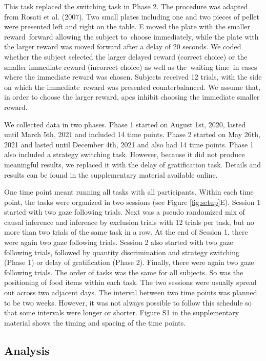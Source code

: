 \documentclass[
  man,floatsintext]{apa6}
\begin{document}
This task replaced the switching task in Phase 2. The procedure was adapted from Rosati et al. (2007). Two small plates including one and two pieces of pellet were presented left and right on the table. E moved the plate with the smaller reward~forward allowing the subject to~choose immediately, while the plate with the larger reward was moved forward after a delay of 20 seconds. We coded whether the subject selected the larger delayed reward (correct choice) or the smaller immediate reward (incorrect choice) as well as the~waiting time~in cases where the immediate reward was chosen. Subjects received 12 trials, with the side on which the immediate~reward was presented counterbalanced. We assume that, in order to choose the larger reward, apes inhibit choosing the immediate smaller reward.

We collected data in two phases. Phase 1 started on August 1st, 2020, lasted until March 5th, 2021 and included 14 time points. Phase 2 started on May 26th, 2021 and lasted until December 4th, 2021 and also had 14 time points. Phase 1 also included a strategy switching task. However, because it did not produce meaningful results, we replaced it with the delay of gratification task. Details and results can be found in the supplementary material available online.

One time point meant running all tasks with all participants. Within each time point, the tasks were organized in two sessions (see Figure \ref{fig:setup}E). Session 1 started with two gaze following trials. Next was a pseudo randomized mix of causal inference and inference by exclusion trials with 12 trials per task, but no more than two trials of the same task in a row. At the end of Session 1, there were again two gaze following trials. Session 2 also started with two gaze following trials, followed by quantity discrimination and strategy switching (Phase 1) or delay of gratification (Phase 2). Finally, there were again two gaze following trials. The order of tasks was the same for all subjects. So was the positioning of food items within each task. The two sessions were usually spread out across two adjacent days. The interval between two time points was planned to be two weeks. However, it was not always possible to follow this schedule so that some intervals were longer or shorter. Figure S1 in the supplementary material shows the timing and spacing of the time points.

\hypertarget{analysis}{%
\subsection{Analysis}\label{analysis}}
\end{document}
